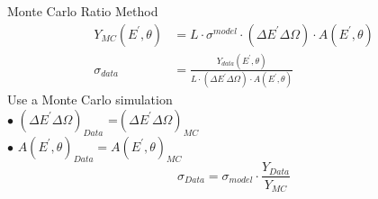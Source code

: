 \documentclass[12pt]{beamer}
\begin{document}
\begin{frame}
	\begin{block}{Monte Carlo Ratio Method}
	\begin{align}
		Y_{MC}(E^{\prime},\theta) &= L \cdot \sigma^{model} \cdot (\Delta E^{\prime} \Delta \Omega) \cdot A(E^{\prime},\theta) \nonumber\\
		\sigma_{data} &= \frac{Y_{data}(E^{\prime},\theta)}{ L \cdot (\Delta E^{\prime} \Delta \Omega) \cdot A(E^{\prime},\theta) }\nonumber
	\end{align}
	Use a Monte Carlo simulation  \\
	$\bullet$ $(\Delta E^{\prime} \Delta \Omega)_{Data}$ =$(\Delta E^{\prime} \Delta \Omega)_{MC}$\\
	$\bullet$ $A(E^{\prime},\theta)_{Data} = A(E^{\prime},\theta)_{MC}$
	\begin{equation}
		\sigma_{Data} = \sigma_{model} \cdot \frac{Y_{Data}}{Y_{MC}}\nonumber
	\end{equation} 
	\end{block}
\end{frame}
\end{document}

